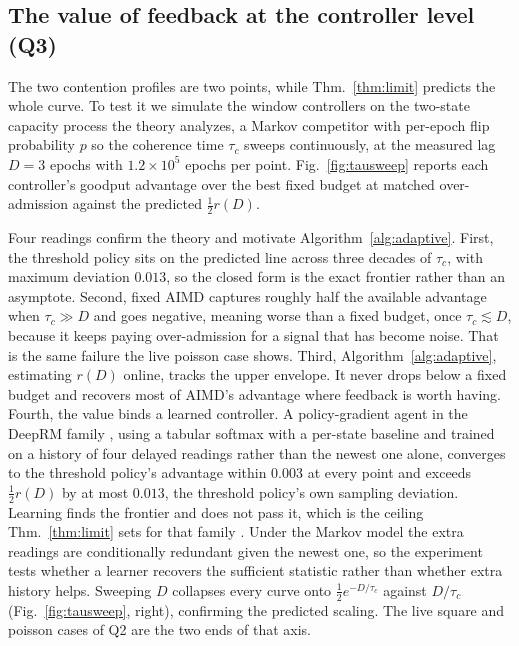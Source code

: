 \subsection{The value of feedback at the controller level (Q3)}
\label{sec:eval-law}
The two contention profiles are two points, while Thm.~\ref{thm:limit} predicts
the whole curve. To test it we simulate the window controllers on the two-state
capacity process the theory analyzes, a Markov competitor with per-epoch flip
probability $p$ so the coherence time $\tau_c$ sweeps continuously, at the
measured lag $D{=}3$ epochs with $1.2\times10^{5}$ epochs per point.
Fig.~\ref{fig:tausweep} reports each controller's goodput advantage over the best
fixed budget at matched over-admission against the predicted $\tfrac12 r(D)$.

Four readings confirm the theory and motivate Algorithm~\ref{alg:adaptive}. First,
the threshold policy sits on the predicted line across three decades of $\tau_c$,
with maximum deviation $0.013$, so the closed form is the exact frontier rather
than an asymptote. Second, fixed AIMD captures roughly half the available
advantage when $\tau_c\gg D$ and goes negative, meaning worse than a fixed budget,
once $\tau_c\lesssim D$, because it keeps paying over-admission for a signal that
has become noise. That is the same failure the live poisson case shows. Third,
Algorithm~\ref{alg:adaptive}, estimating $r(D)$ online, tracks the upper envelope.
It never drops below a fixed budget and recovers most of AIMD's advantage where
feedback is worth having. Fourth, the value binds a learned controller. A
policy-gradient agent in the DeepRM family \cite{deeprm}, using a tabular softmax
with a per-state baseline \cite{inputdriven} and trained on a history of four
delayed readings rather than the newest one alone, converges to the threshold
policy's advantage
within $0.003$ at every point and exceeds $\tfrac12 r(D)$ by at most $0.013$, the
threshold policy's own sampling deviation. Learning finds the frontier and does not
pass it, which is the ceiling Thm.~\ref{thm:limit} sets for that family
\cite{deeprm,decima}. Under the Markov model the extra readings are
conditionally redundant given the newest one, so the experiment tests whether a
learner recovers the sufficient statistic rather than whether extra history
helps. Sweeping $D$ collapses every curve onto
$\tfrac12 e^{-D/\tau_c}$ against $D/\tau_c$ (Fig.~\ref{fig:tausweep}, right),
confirming the predicted scaling. The live square and poisson cases of Q2 are the
two ends of that axis.

